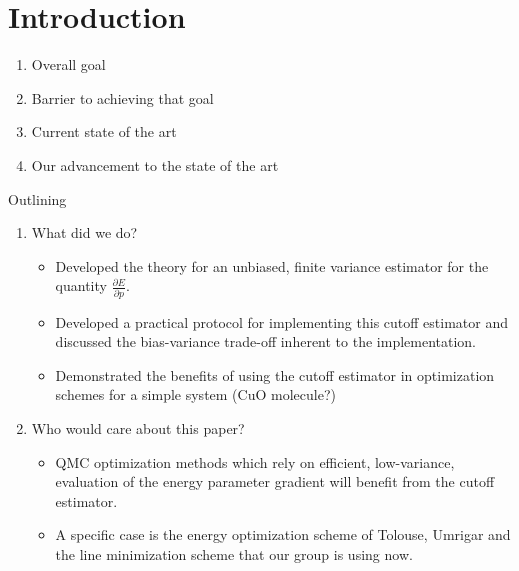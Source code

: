 \documentclass{article}
\begin{document}
\section{Introduction}
\begin{enumerate}
\item Overall goal

\item Barrier to achieving that goal 

\item Current state of the art 

\item Our advancement to the state of the art 

\end{enumerate}

\pagebreak
Outlining 

\begin{enumerate}
\item What did we do? 
\begin{itemize}
\item Developed the theory for an unbiased, finite variance estimator for the quantity $\frac{\partial E}{\partial p}$.
\item Developed a practical protocol for implementing this cutoff estimator and discussed the bias-variance trade-off inherent to the implementation.
\item Demonstrated the benefits of using the cutoff estimator in optimization schemes for a simple system (CuO molecule?)
\end{itemize} 
\item Who would care about this paper?

\begin{itemize}
\item QMC optimization methods which rely on efficient, low-variance, evaluation of the energy parameter gradient will benefit from the cutoff estimator. 
\item A specific case is the energy optimization scheme of Tolouse, Umrigar and the line minimization scheme that our group is using now.
\end{itemize} 


\end{enumerate}
\end{document}
